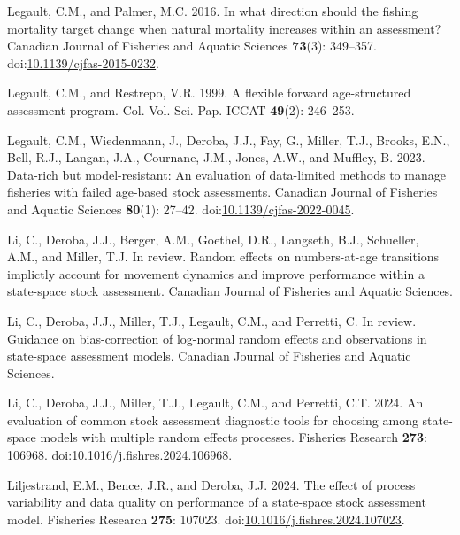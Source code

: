 \documentclass[
  12pt,
]{article}
\newlength{\cslhangindent}
\newenvironment{CSLReferences}[2] %
 {\begin{list}{}{%
  \setlength{\itemindent}{0pt}
  \setlength{\leftmargin}{0pt}
  \setlength{\parsep}{0pt}
  \ifodd #1
   \setlength{\leftmargin}{\cslhangindent}
   \setlength{\itemindent}{-1\cslhangindent}
  \fi
  \setlength{\itemsep}{#2\baselineskip}}}
 {\end{list}}
\begin{document}
\begin{CSLReferences}{1}{0}
Legault, C.M., and Palmer, M.C. 2016. In what direction should the
fishing mortality target change when natural mortality increases within
an assessment? Canadian Journal of Fisheries and Aquatic Sciences
\textbf{73}(3): 349--357.
doi:\href{https://doi.org/10.1139/cjfas-2015-0232}{10.1139/cjfas-2015-0232}.

Legault, C.M., and Restrepo, V.R. 1999. A flexible forward
age-structured assessment program. Col. Vol. Sci. Pap. ICCAT
\textbf{49}(2): 246--253.

Legault, C.M., Wiedenmann, J., Deroba, J.J., Fay, G., Miller, T.J.,
Brooks, E.N., Bell, R.J., Langan, J.A., Cournane, J.M., Jones, A.W., and
Muffley, B. 2023. Data-rich but model-resistant: An evaluation of
data-limited methods to manage fisheries with failed age-based stock
assessments. Canadian Journal of Fisheries and Aquatic Sciences
\textbf{80}(1): 27--42.
doi:\href{https://doi.org/10.1139/cjfas-2022-0045}{10.1139/cjfas-2022-0045}.

Li, C., Deroba, J.J., Berger, A.M., Goethel, D.R., Langseth, B.J.,
Schueller, A.M., and Miller, T.J. In review. Random effects on
numbers-at-age transitions implictly account for movement dynamics and
improve performance within a state-space stock assessment. Canadian
Journal of Fisheries and Aquatic Sciences.

Li, C., Deroba, J.J., Miller, T.J., Legault, C.M., and Perretti, C. In
review. Guidance on bias-correction of log-normal random effects and
observations in state-space assessment models. Canadian Journal of
Fisheries and Aquatic Sciences.

Li, C., Deroba, J.J., Miller, T.J., Legault, C.M., and Perretti, C.T.
2024. An evaluation of common stock assessment diagnostic tools for
choosing among state-space models with multiple random effects
processes. Fisheries Research \textbf{273}: 106968.
doi:\href{https://doi.org/10.1016/j.fishres.2024.106968}{10.1016/j.fishres.2024.106968}.

Liljestrand, E.M., Bence, J.R., and Deroba, J.J. 2024. The effect of
process variability and data quality on performance of a state-space
stock assessment model. Fisheries Research \textbf{275}: 107023.
doi:\href{https://doi.org/10.1016/j.fishres.2024.107023}{10.1016/j.fishres.2024.107023}.


\end{CSLReferences}
\end{document}
